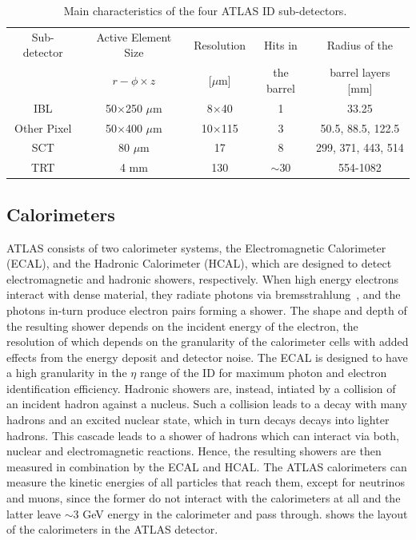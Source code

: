 \begin{table}[!ht]
    \centering
    \begin{tabular}{ccccc}
        \hline \hline
        Sub-detector & Active Element Size & Resolution & Hits in & Radius of the \\
         & $r-\phi \times z$ & [$\mu$m] & the barrel & barrel layers [mm] \\
         \hline
        IBL   & 50$\times$250 $\mu$m & 8$\times$40  & 1   & 33.25 \\
        Other Pixel & 50$\times$400 $\mu$m & 10$\times$115 & 3   & 50.5, 88.5, 122.5 \\
        SCT   & 80 $\mu$m          & 17            & 8   & 299, 371, 443, 514 \\
        TRT   & 4 mm               & 130           & $\sim$30 & 554-1082 \\
        \hline \hline
    \end{tabular}
    \caption{Main characteristics of the four ATLAS ID sub-detectors.~\cite{ATLAS-CONF-2014-047, ATL-INDET-PUB-2016-001}}
    \label{tab:id_chars}
\end{table}

\subsection{Calorimeters}
ATLAS consists of two calorimeter systems, the Electromagnetic Calorimeter (ECAL), and the Hadronic Calorimeter (HCAL), which are designed to detect electromagnetic and hadronic showers, respectively. When high energy electrons interact with dense material, they radiate photons via bremsstrahlung~\cite{Workman:2022ynf}, and the photons in-turn produce electron pairs forming a shower. The shape and depth of the resulting shower depends on the incident energy of the electron, the resolution of which depends on the granularity of the calorimeter cells with added effects from the energy deposit and detector noise. The ECAL is designed to have a high granularity in the $\eta$ range of the ID for maximum photon and electron identification efficiency. Hadronic showers are, instead, intiated by a collision of an incident hadron against a nucleus. Such a collision leads to a decay with many hadrons and an excited nuclear state, which in turn decays decays into lighter hadrons. This cascade leads to a shower of hadrons which can interact via both, nuclear and electromagnetic reactions. Hence, the resulting showers are then measured in combination by the ECAL and HCAL. The ATLAS calorimeters can measure the kinetic energies of all particles that reach them, except for neutrinos and muons, since the former do not interact with the calorimeters at all and the latter leave $\sim$3 GeV energy in the calorimeter and pass through.  shows the layout of the calorimeters in the ATLAS detector. 

